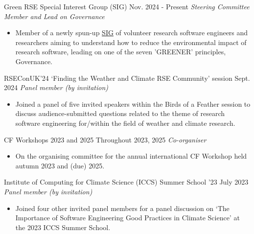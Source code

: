 
\begin{projects}

\projecta
	{Green RSE Special Interest Group (SIG) \lbrack\href{https://socrse.github.io/green-sig/committee.html#sadie-bartholomew}{\small{\websiteSymbol}}\rbrack}{Nov. 2024 - Present}
	{
	    \textit{Steering Committee Member and Lead on Governance}
	}
	{
    \begin{itemize}
        \item Member of a newly spun-up \href{https://socrse.github.io/green-sig/}{SIG} of volunteer research software engineers and researchers aiming to understand how to reduce the environmental impact of research software, leading on one of the seven 'GREENER' principles, Governance.
    \end{itemize}}

\projecta
	{RSEConUK'24 `Finding the Weather and Climate RSE Community' session \lbrack\href{https://society-rse.org/weather-and-climate-rsecon24-birds-of-a-feather-session-retrospective-blog-post/}{\small{\websiteSymbol}}\rbrack}{Sept. 2024}
	{
	    \textit{Panel member (by invitation)}
	}
	{
    \begin{itemize}
        \item Joined a panel of five invited speakers within the Birds of a Feather session to discuss audience-submitted questions related to the theme of research software engineering for/within the field of weather and climate research.
    \end{itemize}}

\projecta
	{CF Workshops 2023 and 2025 \lbrack\href{https://cfconventions.org/Meetings/2023-Workshop.html}{\small{\websiteSymbol}}\rbrack}{Throughout 2023, 2025}
	{
	    \textit{Co-organiser}
	}
	{\begin{itemize}
     \item On the organising committee for the annual international CF Workshop  held autumn 2023 and (due) 2025.
     \end{itemize}}

\projecta
	{Institute of Computing for Climate Science (ICCS) Summer School '23 \lbrack\href{https://iccs.cam.ac.uk/events/iccs-summer-school-2023}{\small{\websiteSymbol}}\rbrack}{July 2023}
	{
	    \textit{Panel member (by invitation)}
	}
	{
    \begin{itemize}
        \item Joined four other invited panel members for a panel discussion on `The Importance of Software Engineering Good Practices in Climate Science' at the 2023 ICCS Summer School.
    \end{itemize}}



\end{projects}
